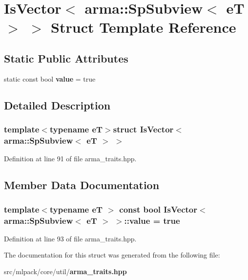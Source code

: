 \section{Is\-Vector$<$ arma\-:\-:Sp\-Subview$<$ e\-T $>$ $>$ Struct Template Reference}
\label{structIsVector_3_01arma_1_1SpSubview_3_01eT_01_4_01_4}
\subsection*{Static Public Attributes}
\begin{DoxyCompactItemize}
\item 
static const bool {\bf value} = true
\end{DoxyCompactItemize}


\subsection{Detailed Description}
\subsubsection*{template$<$typename e\-T$>$struct Is\-Vector$<$ arma\-::\-Sp\-Subview$<$ e\-T $>$ $>$}



Definition at line 91 of file arma\-\_\-traits.\-hpp.



\subsection{Member Data Documentation}
\subsubsection[{value}]{\setlength{\rightskip}{0pt plus 5cm}template$<$typename e\-T $>$ const bool {\bf Is\-Vector}$<$ arma\-::\-Sp\-Subview$<$ e\-T $>$ $>$\-::value = true\hspace{0.3cm}{\ttfamily [static]}}\label{structIsVector_3_01arma_1_1SpSubview_3_01eT_01_4_01_4_af4e0f76aa9ad00c0aa492cb8e9725b59}


Definition at line 93 of file arma\-\_\-traits.\-hpp.



The documentation for this struct was generated from the following file\-:\begin{DoxyCompactItemize}
\item 
src/mlpack/core/util/{\bf arma\-\_\-traits.\-hpp}\end{DoxyCompactItemize}
